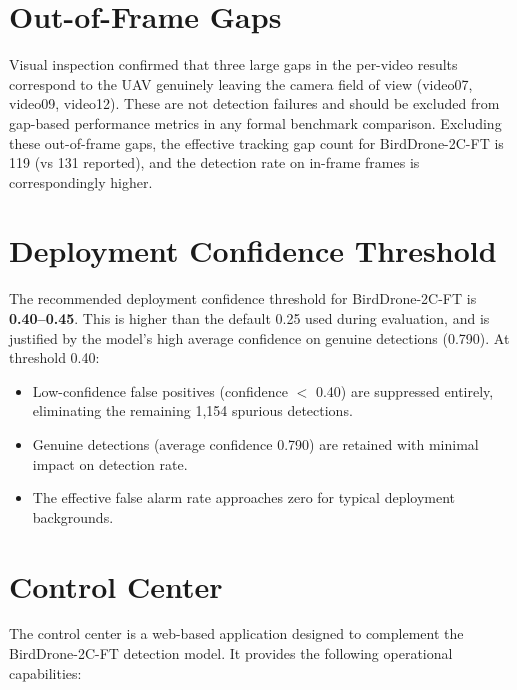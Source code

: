 \documentclass[12pt,a4paper]{report}
\begin{document}
\section{Out-of-Frame Gaps}

Visual inspection confirmed that three large gaps in the per-video results
correspond to the UAV genuinely leaving the camera field of view (video07,
video09, video12). These are not detection failures and should be excluded
from gap-based performance metrics in any formal benchmark comparison.
Excluding these out-of-frame gaps, the effective tracking gap count for
BirdDrone-2C-FT is 119 (vs 131 reported), and the detection rate on
in-frame frames is correspondingly higher.

\section{Deployment Confidence Threshold}

The recommended deployment confidence threshold for BirdDrone-2C-FT is
\textbf{0.40--0.45}. This is higher than the default 0.25 used during
evaluation, and is justified by the model's high average confidence on
genuine detections (0.790). At threshold 0.40:

\begin{itemize}
  \item Low-confidence false positives (confidence $<$ 0.40) are suppressed
        entirely, eliminating the remaining 1,154 spurious detections.
  \item Genuine detections (average confidence 0.790) are retained with
        minimal impact on detection rate.
  \item The effective false alarm rate approaches zero for typical deployment
        backgrounds.
\end{itemize}

\section{Control Center}

The control center is a web-based application designed to complement the
BirdDrone-2C-FT detection model. It provides the following operational
capabilities:
\end{document}
